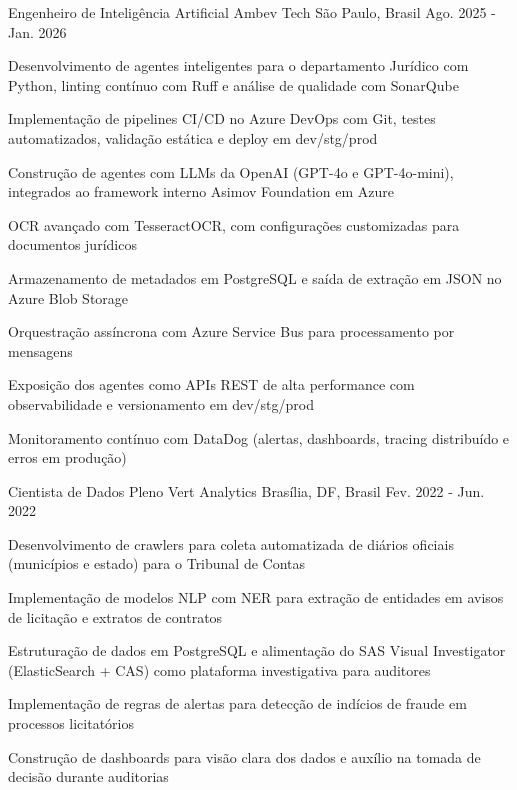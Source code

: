 \begin{cventries}
  \cventry
    {Engenheiro de Inteligência Artificial} %
    {Ambev Tech} %
    {São Paulo, Brasil} %
    {Ago. 2025 - Jan. 2026} %
    {
      \begin{cvitems} %
        \item {Desenvolvimento de agentes inteligentes para o departamento Jurídico com Python, linting contínuo com Ruff e análise de qualidade com SonarQube}
        \item {Implementação de pipelines CI/CD no Azure DevOps com Git, testes automatizados, validação estática e deploy em dev/stg/prod}
        \item {Construção de agentes com LLMs da OpenAI (GPT-4o e GPT-4o-mini), integrados ao framework interno Asimov Foundation em Azure}
        \item {OCR avançado com TesseractOCR, com configurações customizadas para documentos jurídicos}
        \item {Armazenamento de metadados em PostgreSQL e saída de extração em JSON no Azure Blob Storage}
        \item {Orquestração assíncrona com Azure Service Bus para processamento por mensagens}
        \item {Exposição dos agentes como APIs REST de alta performance com observabilidade e versionamento em dev/stg/prod}
        \item {Monitoramento contínuo com DataDog (alertas, dashboards, tracing distribuído e erros em produção)}
      \end{cvitems}
    }

  \cventry
    {Cientista de Dados Pleno} %
    {Vert Analytics} %
    {Brasília, DF, Brasil} %
    {Fev. 2022 - Jun. 2022} %
    {
      \begin{cvitems} %
        \item {Desenvolvimento de crawlers para coleta automatizada de diários oficiais (municípios e estado) para o Tribunal de Contas}
        \item {Implementação de modelos NLP com NER para extração de entidades em avisos de licitação e extratos de contratos}
        \item {Estruturação de dados em PostgreSQL e alimentação do SAS Visual Investigator (ElasticSearch + CAS) como plataforma investigativa para auditores}
        \item {Implementação de regras de alertas para detecção de indícios de fraude em processos licitatórios}
        \item {Construção de dashboards para visão clara dos dados e auxílio na tomada de decisão durante auditorias}
      \end{cvitems}
    }


\end{cventries}
